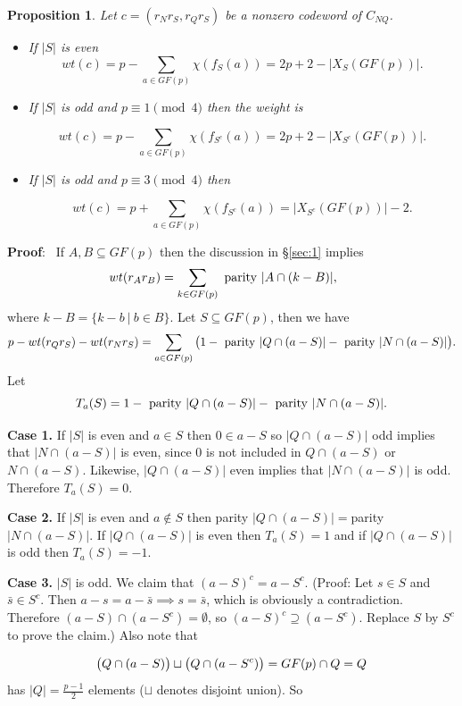 \documentclass[submission%
]{dmtcs}
\newtheorem{proposition}{Proposition}
\def\pf{{\bf Proof}:\ }
\begin{document}
\begin{proposition}
\label{lemma:main}
Let $c=(r_N r_S, r_Q r_S)$ be a nonzero
codeword of $C_{NQ}$. 
\begin{itemize}
\item[(a)] If $|S|$ is even
\[
wt(c)=p - \sum_{a\in GF(p)} \chi(f_S(a))
=2p+2-|X_S(GF(p))|.
\]
 
\item[(b)] If $|S|$ is odd and $p\equiv 1\pmod 4$ then the weight is

\[
wt(c)=p - \sum_{a\in GF(p)} \chi(f_{S^c}(a))
=2p+2-|X_{S^c}(GF(p))|.
\] 

\item[(c)] If $|S|$ is odd and $p\equiv 3\pmod 4$ then

\[
wt(c)=p +  \sum_{a\in GF(p)} \chi(f_{S^c}(a))
=|X_{S^c}(GF(p))|-2.
\]
\end{itemize}
\end{proposition}

\pf
If $A,B\subseteq GF(p)$ then the discussion in \S \ref{sec:1}
implies
\begin{equation}
\label{*}
wt(r_A r_B)=\sum_{k\in GF(p)} \ {\rm parity}\ |A\cap (k-B)|, \ \ \ \ 
\end{equation}
where $k-B=\lbrace k-b\ |\ b\in B\rbrace$. 
Let $S\subseteq GF(p)$, then we have
\[
p-wt(r_Q r_S)-wt(r_N r_S)
=\sum_{a\in GF(p)} 
\big{(}
1-\ {\rm parity}\ |Q\cap (a-S)|-\ {\rm parity}\ |N\cap (a-S)|
\big{)}.
\]
Let
\[
T_a(S)=1-\ {\rm parity}\ |Q\cap (a-S)|-\ {\rm parity}\ |N\cap (a-S)|.
\]

{\bf Case 1.} 
If $|S|$ is even and $a\in S$ then $0\in a-S$ so $|Q\cap (a-S)|$ 
odd implies that $|N\cap (a-S)|$ is even, since $0$ is not included 
in $Q\cap (a-S)$ or $N\cap (a-S)$.  Likewise, $|Q\cap (a-S)|$ even 
implies that $|N\cap (a-S)|$ is odd.  Therefore $T_a(S)=0$.

{\bf Case 2.} If $|S|$ is even and $a\notin S$ then parity
$|Q\cap (a-S)|=$parity$|N\cap (a-S)|$.  If $|Q\cap (a-S)|$ is even then 
$T_a(S)=1$ and if $|Q\cap (a-S)|$ is odd then $T_a(S)=-1$.

{\bf Case 3.} $|S|$ is odd.  We claim that $(a-S)^c=a-S^c$.  (Proof: Let 
$s\in S$ and $\bar s\in S^c$.  Then $a-s=a-\bar s\implies s=\bar s$, which 
is obviously a contradiction. Therefore $(a-S)\cap (a-S^c)=\emptyset$, so 
$(a-S)^c\supseteq(a-S^c).$ Replace $S$ by $S^c$ to prove the claim.)  
Also note that 

\[
\big{(} Q\cap (a-S)\big{)} \sqcup \big{(} Q\cap (a-S^c) \big{)}
=GF(p)\cap Q=Q
\]
has $|Q|=\frac{p-1}{2}$ elements ($\sqcup$ denotes disjoint union).  
So
\end{document}
